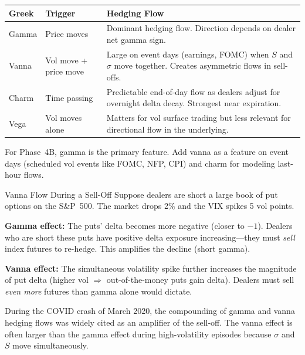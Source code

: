 \begin{keyidea}
\begin{center}
\small
\begin{tabular}{@{}llp{6cm}@{}}
\toprule
\textbf{Greek} & \textbf{Trigger} & \textbf{Hedging Flow} \\
\midrule
Gamma & Price moves &
  Dominant hedging flow.  Direction depends on dealer net gamma sign. \\
Vanna & Vol move + price move &
  Large on event days (earnings, FOMC) when $S$ and $\sigma$ move
  together.  Creates asymmetric flows in sell-offs. \\
Charm & Time passing &
  Predictable end-of-day flow as dealers adjust for overnight
  delta decay.  Strongest near expiration. \\
Vega & Vol moves alone &
  Matters for vol surface trading but less relevant for
  directional flow in the underlying. \\
\bottomrule
\end{tabular}
\end{center}

For Phase~4B, gamma is the primary feature.  Add vanna as a
feature on event days (scheduled vol events like FOMC, NFP, CPI)
and charm for modeling last-hour flows.
\end{keyidea}

\begin{workedexample}{Vanna Flow During a Sell-Off}
Suppose dealers are short a large book of put options on the S\&P~500.
The market drops 2\% and the VIX spikes 5 vol points.

\textbf{Gamma effect:} The puts' delta becomes more negative
(closer to $-1$).  Dealers who are short these puts have positive
delta exposure increasing---they must \emph{sell} index futures to
re-hedge.  This amplifies the decline (short gamma).

\textbf{Vanna effect:} The simultaneous volatility spike further
increases the magnitude of put delta (higher vol $\Rightarrow$
out-of-the-money puts gain delta).  Dealers must sell \emph{even more}
futures than gamma alone would dictate.

During the COVID crash of March 2020, the compounding of gamma and
vanna hedging flows was widely cited as an amplifier of the sell-off.
The vanna effect is often larger than the gamma effect during
high-volatility episodes because $\sigma$ and $S$ move
simultaneously.
\end{workedexample}


